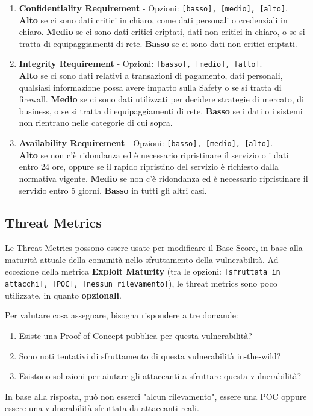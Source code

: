 \documentclass{article}
\begin{document}
\begin{enumerate}
	\item \textbf{Confidentiality Requirement} - Opzioni: \verb|[basso], [medio], [alto]|.\\ \textbf{Alto} se ci sono dati critici in chiaro, come dati personali o credenziali in chiaro. \textbf{Medio} se ci sono dati critici criptati, dati non critici in chiaro, o se si
	tratta di equipaggiamenti di rete. \textbf{Basso} se ci sono dati non critici criptati.
	
	\item \textbf{Integrity Requirement} - Opzioni: \verb|[basso], [medio], [alto]|.\\ \textbf{Alto} se ci sono dati relativi a transazioni di pagamento, dati personali, qualsiasi informazione possa avere impatto sulla Safety o se si tratta di firewall. \textbf{Medio} se ci sono dati utilizzati per decidere strategie di mercato, di business, o se si tratta di equipaggiamenti di rete. \textbf{Basso} se i dati o i sistemi non rientrano nelle categorie di cui sopra.
	
	
	\item \textbf{Availability Requirement} - Opzioni: \verb|[basso], [medio], [alto]|.\\ \textbf{Alto} se non c’è ridondanza ed è necessario ripristinare il servizio o i dati entro 24 ore, oppure se il rapido ripristino del servizio è richiesto dalla normativa vigente. \textbf{Medio} se non c’è ridondanza ed è necessario ripristinare il servizio entro 5 giorni. \textbf{Basso} in tutti gli altri casi.
\end{enumerate}

\subsection{Threat Metrics}
Le Threat Metrics possono essere usate per modificare il Base Score, in base alla maturità attuale della comunità nello sfruttamento della vulnerabilità. Ad eccezione della metrica \textbf{Exploit Maturity} (tra le opzioni: \verb|[sfruttata in attacchi], [POC], [nessun rilevamento]|), le threat metrics sono poco utilizzate, in quanto \textbf{opzionali}.

Per valutare cosa assegnare, bisogna rispondere a tre domande:
\begin{enumerate}
	\item Esiste una Proof-of-Concept pubblica per questa vulnerabilità? 
	\item Sono noti tentativi di sfruttamento di questa vulnerabilità in-the-wild?
	\item Esistono soluzioni per aiutare gli attaccanti a sfruttare questa vulnerabilità?
\end{enumerate}

In base alla risposta, può non esserci "alcun rilevamento", essere una POC oppure essere una vulnerabilità sfruttata da attaccanti reali.
\end{document}
